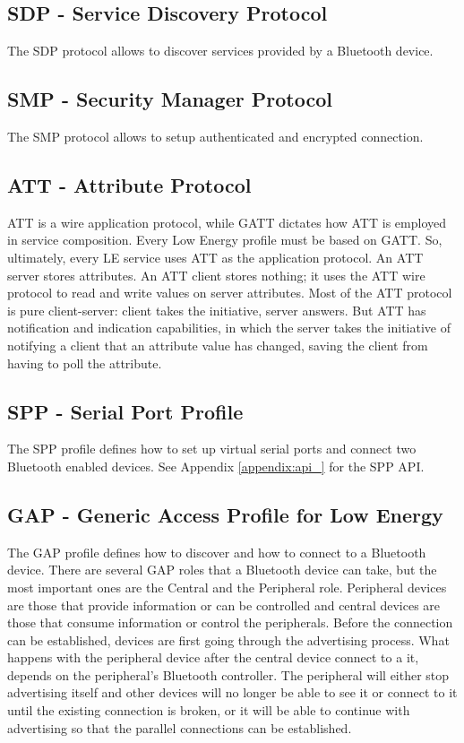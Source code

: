 \subsection{SDP - Service Discovery Protocol}
The SDP protocol allows to discover services provided by a Bluetooth device. 

\subsection{SMP - Security Manager Protocol }
The SMP protocol allows to setup authenticated and encrypted connection.

\subsection{ATT - Attribute Protocol}
ATT is a wire application protocol, while GATT dictates how ATT is employed in service composition. Every Low Energy profile must be based on GATT. So, ultimately, every LE service uses ATT as the application protocol. An ATT server stores attributes. An ATT client stores nothing; it uses the ATT wire protocol to read and write values on server attributes. Most of the ATT protocol is pure client-server: client takes the initiative, server answers. But ATT has notification and indication capabilities, in which the server takes the initiative of notifying a client that an attribute value has changed, saving the client from having to poll the attribute.

\subsection{SPP - Serial Port Profile}
The SPP profile defines how to set up virtual serial ports and connect two Bluetooth enabled devices. See Appendix \ref{appendix:api_} for the SPP API.

\subsection{GAP - Generic Access Profile for Low Energy}
The GAP profile defines how to discover and how to connect to a Bluetooth device. There are several GAP roles that a Bluetooth device can take, but the most important ones are the Central and the Peripheral role. Peripheral devices are those that provide information or can be controlled and central devices are those that consume information or control the peripherals. Before the connection can be established, devices are first going through the advertising process. What happens with the peripheral device after the central device connect to a it, depends on the peripheral's Bluetooth controller. The peripheral will either stop advertising itself and other devices will no longer be able to see it or connect to it until the existing connection is broken, or it will be able to continue with advertising so that the parallel connections can be established.
